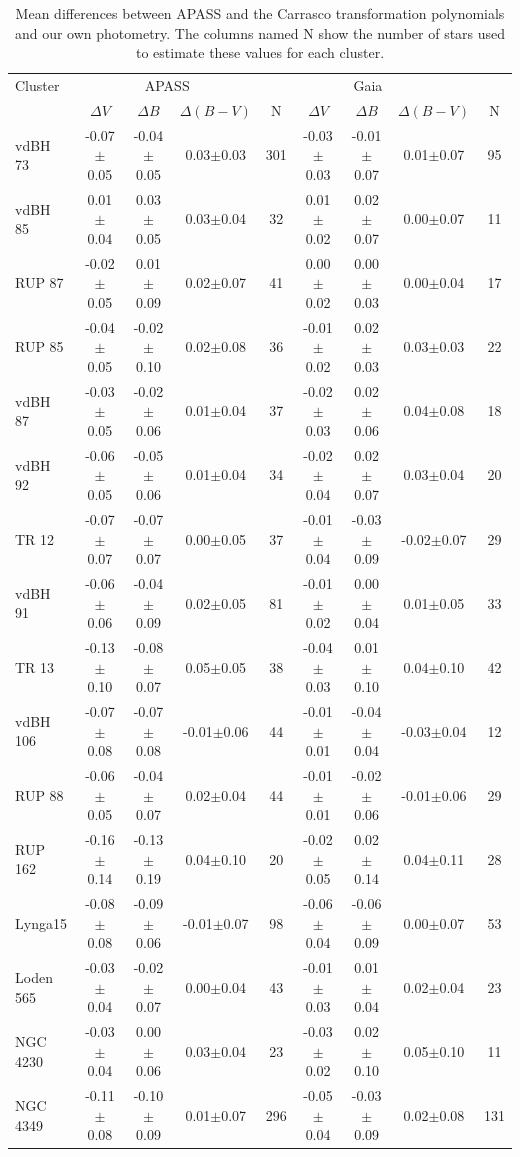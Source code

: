 \documentclass[draft]{aa}
\begin{document}
\begin{table}[ht]
    \centering
\caption{Mean differences between APASS and the Carrasco transformation
polynomials and our own photometry. The columns named N show the
number of stars used to estimate these values for each cluster.}
    \begin{tabular}{lcccc|cccc}
    \hline \hline 
Cluster & \multicolumn{3}{c}{APASS} & \multicolumn{4}{c}{Gaia}\\
 & $\Delta V$ & $\Delta B$ & $\Delta (B-V)$ & N & $\Delta V$ &
$\Delta B$ & $\Delta (B-V)$ & N\\
    \hline
vdBH 73   & -0.07$\pm$0.05 & -0.04$\pm$0.05 & 0.03$\pm$0.03 & 301 &
-0.03$\pm$0.03 & -0.01$\pm$0.07 & 0.01$\pm$0.07 & 95\\
vdBH 85   & 0.01$\pm$0.04 & 0.03$\pm$0.05 & 0.03$\pm$0.04 & 32 &
0.01$\pm$0.02 & 0.02$\pm$0.07 & 0.00$\pm$0.07 & 11\\
RUP 87    & -0.02$\pm$0.05 & 0.01$\pm$0.09 & 0.02$\pm$0.07 & 41 &
0.00$\pm$0.02 & 0.00$\pm$0.03 & 0.00$\pm$0.04 & 17\\
RUP 85    & -0.04$\pm$0.05 & -0.02$\pm$0.10 & 0.02$\pm$0.08 & 36 &
-0.01$\pm$0.02 & 0.02$\pm$0.03 & 0.03$\pm$0.03 & 22\\
vdBH 87   & -0.03$\pm$0.05 & -0.02$\pm$0.06 & 0.01$\pm$0.04 & 37 &
-0.02$\pm$0.03 & 0.02$\pm$0.06 & 0.04$\pm$0.08 & 18\\
vdBH 92   & -0.06$\pm$0.05 & -0.05$\pm$0.06 & 0.01$\pm$0.04 & 34 &
-0.02$\pm$0.04 & 0.02$\pm$0.07 & 0.03$\pm$0.04 & 20\\
TR 12     & -0.07$\pm$0.07 & -0.07$\pm$0.07 & 0.00$\pm$0.05 & 37 &
-0.01$\pm$0.04 & -0.03$\pm$0.09 & -0.02$\pm$0.07 & 29\\
vdBH 91   & -0.06$\pm$0.06 & -0.04$\pm$0.09 & 0.02$\pm$0.05 & 81 &
-0.01$\pm$0.02 & 0.00$\pm$0.04 & 0.01$\pm$0.05 & 33\\
TR 13     & -0.13$\pm$0.10 & -0.08$\pm$0.07 & 0.05$\pm$0.05 & 38 &
-0.04$\pm$0.03 & 0.01$\pm$0.10 & 0.04$\pm$0.10 & 42\\
vdBH 106  & -0.07$\pm$0.08 & -0.07$\pm$0.08 & -0.01$\pm$0.06 & 44 &
-0.01$\pm$0.01 & -0.04$\pm$0.04 & -0.03$\pm$0.04 & 12\\
RUP 88    & -0.06$\pm$0.05 & -0.04$\pm$0.07 & 0.02$\pm$0.04 & 44 &
-0.01$\pm$0.01 & -0.02$\pm$0.06 & -0.01$\pm$0.06 & 29\\
RUP 162   & -0.16$\pm$0.14 & -0.13$\pm$0.19 & 0.04$\pm$0.10 & 20 &
-0.02$\pm$0.05 & 0.02$\pm$0.14 & 0.04$\pm$0.11 & 28\\
Lynga15   & -0.08$\pm$0.08 & -0.09$\pm$0.06 & -0.01$\pm$0.07 & 98 &
-0.06$\pm$0.04 & -0.06$\pm$0.09 & 0.00$\pm$0.07 & 53\\
Loden 565 & -0.03$\pm$0.04 & -0.02$\pm$0.07 & 0.00$\pm$0.04 & 43 &
-0.01$\pm$0.03 & 0.01$\pm$0.04 & 0.02$\pm$0.04 & 23\\
NGC 4230  & -0.03$\pm$0.04 & 0.00$\pm$0.06 & 0.03$\pm$0.04 & 23 &
-0.03$\pm$0.02 & 0.02$\pm$0.10 & 0.05$\pm$0.10 & 11\\
NGC 4349  & -0.11$\pm$0.08 & -0.10$\pm$0.09 & 0.01$\pm$0.07 & 296 &
-0.05$\pm$0.04 & -0.03$\pm$0.09 & 0.02$\pm$0.08 & 131\\
    \hline
    \end{tabular}
    \label{tab:phot_diffs}
\end{table}
\end{document}
